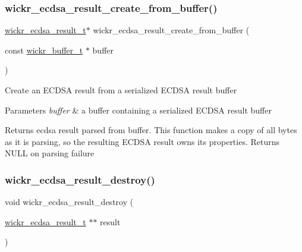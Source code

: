 \subsubsection{\texorpdfstring{wickr\+\_\+ecdsa\+\_\+result\+\_\+create\+\_\+from\+\_\+buffer()}{wickr\_ecdsa\_result\_create\_from\_buffer()}}
{\footnotesize\ttfamily \mbox{\hyperlink{structwickr__ecdsa__result}{wickr\+\_\+ecdsa\+\_\+result\+\_\+t}}$\ast$ wickr\+\_\+ecdsa\+\_\+result\+\_\+create\+\_\+from\+\_\+buffer (\begin{DoxyParamCaption}\item[{const \mbox{\hyperlink{structwickr__buffer}{wickr\+\_\+buffer\+\_\+t}} $\ast$}]{buffer }\end{DoxyParamCaption})}

Create an E\+C\+D\+SA result from a serialized E\+C\+D\+SA result buffer


\begin{DoxyParams}{Parameters}
{\em buffer} & a buffer containing a serialized E\+C\+D\+SA result buffer \\
\hline
\end{DoxyParams}
\begin{DoxyReturn}{Returns}
ecdsa result parsed from \textquotesingle{}buffer\textquotesingle{}. This function makes a copy of all bytes as it is parsing, so the resulting E\+C\+D\+SA result owns its properties. Returns N\+U\+LL on parsing failure 
\end{DoxyReturn}
\mbox{\label{group__wickr__ecdsa__result_ga84fb120b34b4b7ede4042009c735ea5d}} 
\subsubsection{\texorpdfstring{wickr\+\_\+ecdsa\+\_\+result\+\_\+destroy()}{wickr\_ecdsa\_result\_destroy()}}
{\footnotesize\ttfamily void wickr\+\_\+ecdsa\+\_\+result\+\_\+destroy (\begin{DoxyParamCaption}\item[{\mbox{\hyperlink{structwickr__ecdsa__result}{wickr\+\_\+ecdsa\+\_\+result\+\_\+t}} $\ast$$\ast$}]{result }\end{DoxyParamCaption})}

